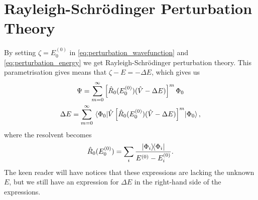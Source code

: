 \section{Rayleigh-Schrödinger Perturbation Theory}

By setting $\zeta = E_0^{(0)}$ in \autoref{eq:perturbation_wavefunction} and
\autoref{eq:perturbation_energy} we get Rayleigh-Schrödinger perturbation
theory\cite{rayleigh1894theory,schrodinger1926quantisierung}. This parametrisation 
gives means that $\zeta - E = - \Delta E$, which gives us 
\begin{gather}
    \label{eq:rspt_wavefunction}
    \Psi = \sum_{m=0}^\infty \left[ 
        \hat{R}_0(E^{(0)}_0) (\hat{V} - \Delta E)     
    \right]^m \Phi_0 \\
    \label{eq:rspt_energy}
    \Delta E =  \sum_{m=0}^\infty \mel*{\Phi_0}
    {
        \hat{V} \left[\hat{R}_0 (E^{(0)}_0)(\hat{V} - \Delta E) \right]^m
    }{\Phi_0},
\end{gather}
where the resolvent becomes
\begin{equation}
    \hat{R}_0(E^{(0)}_0) = \sum_i \frac{\dyad{\Phi_i}{\Phi_i}}{E^{(0)} - E^{(0)}_i}.
\end{equation}
The keen reader will have notices that these expressions are lacking the unknown 
$E$, but we still have an expression for $\Delta E$ in the right-hand side of the
expressions.


